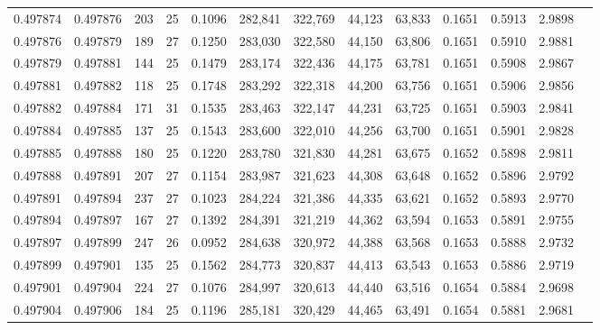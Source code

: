 \begin{tabular}{rrrrrrrrrrrrr}
0.497874 & 0.497876 & 203 &  25 &                                     0.1096 & 282,841 & 322,769 &  44,123 &  63,833 & 0.1651 & 0.5913 & 2.9898 \\
0.497876 & 0.497879 & 189 &  27 &                                     0.1250 & 283,030 & 322,580 &  44,150 &  63,806 & 0.1651 & 0.5910 & 2.9881 \\
0.497879 & 0.497881 & 144 &  25 &                                     0.1479 & 283,174 & 322,436 &  44,175 &  63,781 & 0.1651 & 0.5908 & 2.9867 \\
0.497881 & 0.497882 & 118 &  25 &                                     0.1748 & 283,292 & 322,318 &  44,200 &  63,756 & 0.1651 & 0.5906 & 2.9856 \\
0.497882 & 0.497884 & 171 &  31 &                                     0.1535 & 283,463 & 322,147 &  44,231 &  63,725 & 0.1651 & 0.5903 & 2.9841 \\
0.497884 & 0.497885 & 137 &  25 &                                     0.1543 & 283,600 & 322,010 &  44,256 &  63,700 & 0.1651 & 0.5901 & 2.9828 \\
0.497885 & 0.497888 & 180 &  25 &                                     0.1220 & 283,780 & 321,830 &  44,281 &  63,675 & 0.1652 & 0.5898 & 2.9811 \\
0.497888 & 0.497891 & 207 &  27 &                                     0.1154 & 283,987 & 321,623 &  44,308 &  63,648 & 0.1652 & 0.5896 & 2.9792 \\
0.497891 & 0.497894 & 237 &  27 &                                     0.1023 & 284,224 & 321,386 &  44,335 &  63,621 & 0.1652 & 0.5893 & 2.9770 \\
0.497894 & 0.497897 & 167 &  27 &                                     0.1392 & 284,391 & 321,219 &  44,362 &  63,594 & 0.1653 & 0.5891 & 2.9755 \\
0.497897 & 0.497899 & 247 &  26 &                                     0.0952 & 284,638 & 320,972 &  44,388 &  63,568 & 0.1653 & 0.5888 & 2.9732 \\
0.497899 & 0.497901 & 135 &  25 &                                     0.1562 & 284,773 & 320,837 &  44,413 &  63,543 & 0.1653 & 0.5886 & 2.9719 \\
0.497901 & 0.497904 & 224 &  27 &                                     0.1076 & 284,997 & 320,613 &  44,440 &  63,516 & 0.1654 & 0.5884 & 2.9698 \\
0.497904 & 0.497906 & 184 &  25 &                                     0.1196 & 285,181 & 320,429 &  44,465 &  63,491 & 0.1654 & 0.5881 & 2.9681 \\

\end{tabular}
